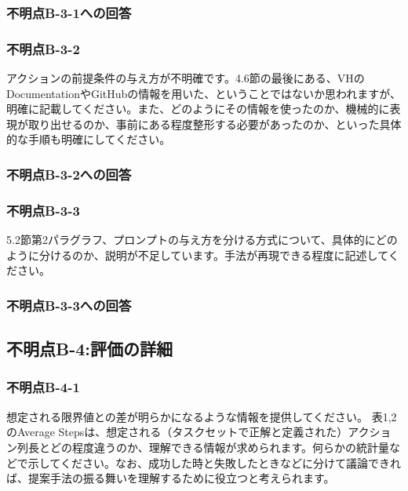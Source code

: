 \documentclass{jsarticle}
\begin{document}
\subsubsection*{不明点B-3-1への回答}

\subsubsection*{不明点B-3-2}
\begin{screen}
アクションの前提条件の与え方が不明確です。4.6節の最後にある、VHのDocumentationやGitHubの情報を用いた、ということではないか思われますが、明確に記載してください。また、どのようにその情報を使ったのか、機械的に表現が取り出せるのか、事前にある程度整形する必要があったのか、といった具体的な手順も明確にしてください。
\end{screen}

\subsubsection*{不明点B-3-2への回答}

\subsubsection*{不明点B-3-3}
\begin{screen}
5.2節第2パラグラフ、プロンプトの与え方を分ける方式について、具体的にどのように分けるのか、説明が不足しています。手法が再現できる程度に記述してください。
\end{screen}

\subsubsection*{不明点B-3-3への回答}

\subsection*{不明点B-4:評価の詳細}

\subsubsection*{不明点B-4-1}
\begin{screen}
想定される限界値との差が明らかになるような情報を提供してください。
表1,2のAverage Stepsは、想定される（タスクセットで正解と定義された）アクション列長とどの程度違うのか、理解できる情報が求められます。何らかの統計量などで示してください。なお、成功した時と失敗したときなどに分けて議論できれば、提案手法の振る舞いを理解するために役立つと考えられます。
\end{screen}
\end{document}
